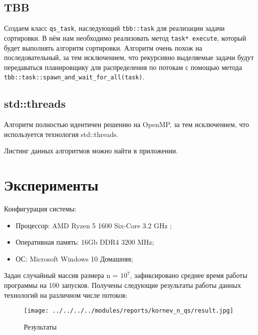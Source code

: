 \documentclass{report}
\begin{document}
\subsection*{TBB}
Создаем класс \verb|qs_task|, наследующий \verb|tbb::task| для реализации задачи сортировки. В нём нам необходимо реализовать метод \verb|task* execute|, который будет выполнять алгоритм сортировки. Алгоритм очень похож на последовательный, за тем исключением, что рекурсивно выделяемые задачи будут передаваться планировщику для распределения по потокам с помощью метода \verb|tbb::task::spawn_and_wait_for_all(task)|.

\subsection*{std::threads}
Алгоритм полностью идентичен решению на OpenMP, за тем исключением, что используется технология std::threads.
\par Листинг данных алгоритмов можно найти в приложении.

\newpage

\section*{Эксперименты}
Конфигурация системы:
\begin{itemize}
\item Процессор: AMD Ryzen 5 1600 Six-Core 3.2 GHz ;
\item Оперативная память: 16Gb DDR4 3200 MHz;
\item ОС: Microsoft Windows 10 Домашняя;
\end{itemize}

\par Задан случайный массив размера n = $10^7$, зафиксировано среднее время работы программы на 100 запусков. Получены следующие результаты работы данных технологий на различном числе потоков:

\begin{figure}[h]
\texttt{[image: ../../../../modules/reports/kornev\_n\_qs/result.jpg]}
\caption{Результаты}
\label{ris:image}
\end{figure}
\end{document}
